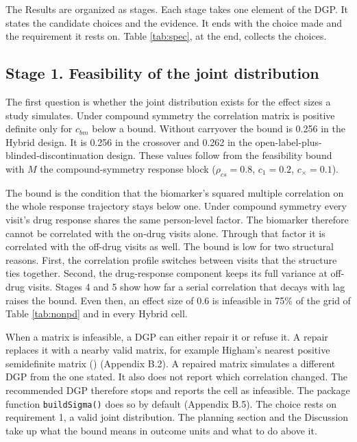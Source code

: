 \documentclass[
  11pt,
]{article}
\begin{document}
The Results are organized as stages. Each stage takes one element of
the DGP. It states the candidate choices and the evidence. It ends
with the choice made and the requirement it rests on. Table
\ref{tab:spec}, at the end, collects the choices.

\subsection{Stage 1. Feasibility of the joint distribution}\label{stage-1.-feasibility-of-the-joint-distribution}

The first question is whether the joint distribution exists for the
effect sizes a study simulates. Under compound symmetry the
correlation matrix is positive definite only for \(c_{bm}\) below a
bound. Without carryover the bound is 0.256 in the Hybrid design. It
is 0.256 in the crossover and 0.262 in the
open-label-plus-blinded-discontinuation design. These values follow
from the feasibility bound with \(M\) the compound-symmetry response
block (\(\rho_{cs} = 0.8\), \(c_1 = 0.2\), \(c_\times = 0.1\)).

The bound is the condition that the biomarker's squared multiple
correlation on the whole response trajectory stays below one. Under
compound symmetry every visit's drug response shares the same
person-level factor. The biomarker therefore cannot be correlated with
the on-drug visits alone. Through that factor it is correlated with
the off-drug visits as well. The bound is low for two structural
reasons. First, the correlation profile switches between visits that
the structure ties together. Second, the drug-response component keeps
its full variance at off-drug visits. Stages 4 and 5 show how far a
serial correlation that decays with lag raises the bound. Even then,
an effect size of 0.6 is infeasible in 75\% of the grid of Table
\ref{tab:nonpd} and in every Hybrid cell.

When a matrix is infeasible, a DGP can either repair it or refuse it.
A repair replaces it with a nearby valid matrix, for example Higham's
nearest positive semidefinite matrix () (Appendix B.2). A
repaired matrix simulates a different DGP from the one stated. It also
does not report which correlation changed. The recommended DGP
therefore stops and reports the cell as infeasible. The package
function \texttt{buildSigma()} does so by default (Appendix B.5). The choice
rests on requirement 1, a valid joint distribution. The planning
section and the Discussion take up what the bound means in outcome
units and what to do above it.
\end{document}
